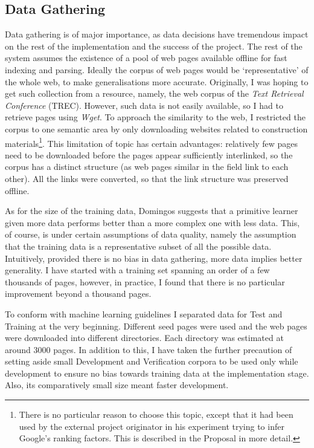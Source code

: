 \documentclass[12pt,notitlepage,twoside]{scrreprt}
\begin{document}
\subsection{Data Gathering}
Data gathering is of major importance, as data decisions have tremendous impact on the
rest of the implementation and the success of the project. The rest of the system assumes
the existence of a pool of web pages available offline for fast indexing and parsing.
Ideally the corpus of web pages would be `representative' of the whole web, to make
generalisations more accurate.  Originally, I was hoping to get such collection from a
resource, namely, the web corpus of the \textit{Text Retrieval Conference} (TREC).
However, such data is not easily available, so I had to retrieve pages using
\textit{Wget}. To approach the similarity to the web, I restricted the corpus to one
semantic area by only downloading websites related to construction
materials\footnote{There is no particular reason to choose this topic, except that it had
been used by the external project originator in his experiment trying to infer Google's
ranking factors. This is described in the Proposal in more detail.}. This limitation of
topic has certain advantages: relatively few pages need to be  downloaded before the pages
appear sufficiently interlinked, so the corpus has a distinct structure (as web pages
similar in the field link to each other). All the links were converted, so that the link
structure was preserved offline.

As for the size of the training data, Domingos \cite{domingos} suggests that a primitive
learner given more data performs better than a more complex one with less data.  This, of
course, is under certain assumptions of data quality, namely the assumption that the
training data is a representative subset of all the possible data. Intuitively, provided
there is no bias in data gathering, more data implies better generality. I have started
with a training set spanning an order of a few thousands of pages, however, in practice, I
found that there is no particular improvement beyond a thousand pages.

To conform with machine learning guidelines I separated data for Test and Training at the
very beginning. Different seed pages were used and the web pages were downloaded into
different directories.  Each directory was estimated at around 3000 pages. In addition to
this, I have taken the further precaution of setting aside small Development and
Verification corpora to be used only while development to ensure no bias towards training
data at the implementation stage. Also, its comparatively small size meant faster
development.
\end{document}

